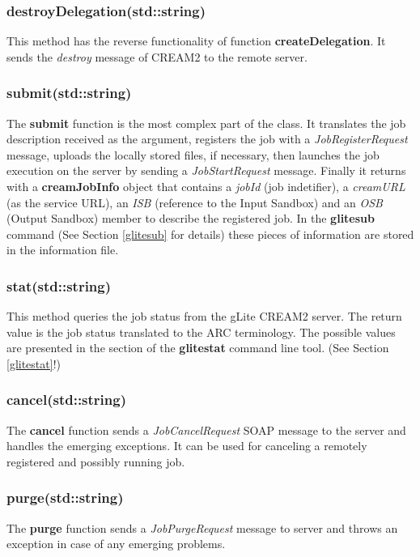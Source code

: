 \documentclass{article}
\begin{document}
\subsubsection*{destroyDelegation(std::string)}
This method has the reverse functionality of function \textbf{createDelegation}. It sends the \textit{destroy} message of CREAM2 to the remote server.
\subsubsection*{submit(std::string)}
The \textbf{submit} function is the most complex part of the class. It translates the job description received as the argument, registers the job with a \textit{JobRegisterRequest} message, uploads the locally stored files, if necessary, then launches the job execution on the server by sending a \textit{JobStartRequest} message. Finally it returns with a \textbf{creamJobInfo} object that contains a \textit{jobId} (job indetifier), a \textit{creamURL} (as the service URL), an \textit{ISB} (reference to the Input Sandbox) and an \textit{OSB} (Output Sandbox) member to describe the registered job. In the \textbf{glitesub} command (See Section \ref{glitesub} for details) these pieces of information are stored in the information file.
\subsubsection*{stat(std::string)}
This method queries the job status from the gLite CREAM2 server. The return value is the job status translated to the ARC terminology. The possible values are presented in the section of the \textbf{glitestat} command line tool. (See Section \ref{glitestat}!)
\subsubsection*{cancel(std::string)}
The \textbf{cancel} function sends a \textit{JobCancelRequest} SOAP message to the server and handles the emerging exceptions. It can be used for canceling a remotely registered and possibly running job.
\subsubsection*{purge(std::string)}
The \textbf{purge} function sends a \textit{JobPurgeRequest} message to server and throws an exception in case of any emerging problems.
\end{document}
